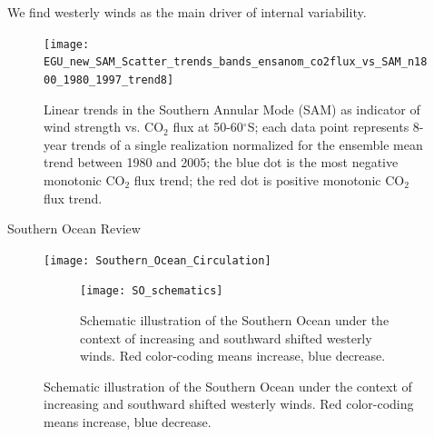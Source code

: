 \documentclass[aspectratio=169]{beamer}
\begin{document}
\begin{frame}{We find westerly winds as the main driver of internal variability.}
\begin{figure}[h!]
\centering
		\texttt{[image: EGU\_new\_SAM\_Scatter\_trends\_bands\_ensanom\_co2flux\_vs\_SAM\_n1800\_1980\_1997\_trend8]}
		
		\vspace{-3mm}
		\caption{Linear trends in the Southern Annular Mode (SAM) as indicator of wind strength vs. CO$_2$ flux at 50-60$^\circ$S; each data point represents 8-year trends of a single realization normalized for the ensemble mean trend  between 1980 and 2005; the blue dot is the most negative monotonic CO$_2$ flux trend; the red dot is positive monotonic CO$_2$ flux trend.}
		\label{fig:scatter}
\end{figure}
\end{frame}



\begin{frame}{Southern Ocean Review}%

\begin{figure}[h]
	\centering
	\begin{minipage}{.5\textwidth}
		\centering
			\texttt{[image: Southern\_Ocean\_Circulation]}
\vspace{-2mm}
	\caption{Dynamics of the Southern Ocean \citep{Morrison2015}}
		\label{fig:SO_review}
	\end{minipage} \hfill
	\begin{minipage}{.4\textwidth}
		\begin{figure}[h!]
			\centering
			\texttt{[image: SO\_schematics]}
			\caption{Schematic illustration of the Southern Ocean under the context of increasing and southward shifted westerly winds. Red color-coding means increase, blue decrease.}
			\label{fig:schematics_neg}
		\end{figure}		
		
	\end{minipage}
\end{figure}

\end{frame}
	
\end{document}
